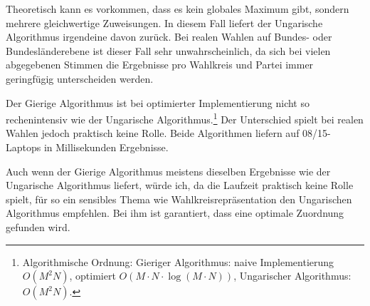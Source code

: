  Theoretisch kann es vorkommen, dass es kein globales Maximum gibt, sondern
mehrere gleichwertige Zuweisungen. In diesem Fall liefert der Ungarische Algorithmus irgendeine
davon zurück. Bei realen Wahlen auf Bundes- oder Bundesländerebene ist dieser Fall sehr
unwahrscheinlich, da sich bei vielen abgegebenen Stimmen die Ergebnisse pro Wahlkreis und Partei
immer geringfügig unterscheiden werden.

Der Gierige Algorithmus ist bei optimierter Implementierung nicht so rechenintensiv wie der
Ungarische Algorithmus.\footnote{Algorithmische Ordnung: Gieriger Algorithmus: naive
Implementierung $O(M^2 N)$, optimiert $O(M \cdot N \cdot \log(M \cdot N))$, Ungarischer
Algorithmus: $O(M^2 N)$.} Der Unterschied spielt bei realen Wahlen jedoch praktisch keine Rolle.
Beide Algorithmen liefern auf 08/15-Laptops in Millisekunden Ergebnisse.

Auch wenn der Gierige Algorithmus meistens dieselben Ergebnisse wie der Ungarische Algorithmus
liefert, würde ich, da die Laufzeit praktisch keine Rolle spielt, für so ein sensibles Thema wie
Wahlkreisrepräsentation den Ungarischen Algorithmus empfehlen. Bei ihm ist garantiert, dass eine
optimale Zuordnung gefunden wird.
